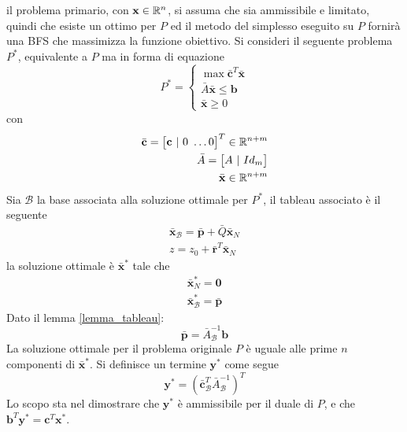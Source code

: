 \documentclass[10pt, letterpaper]{report}
\begin{document}
il problema primario, con $\mathbf x \in {\mathbb R}^n$, si assuma che sia ammissibile e limitato, quindi che esiste un ottimo per $P$ ed il metodo del simplesso eseguito su $P$ fornirà una BFS che massimizza la funzione obiettivo. Si consideri il seguente problema $P^*$, equivalente a $P$ ma in forma di equazione
$$ P^*=\begin{cases}
    \max \bar {\mathbf c}^T\bar {\mathbf x}\\ 
        \bar A\bar {\mathbf x} \le \mathbf b \\ 
        \bar {\mathbf x} \ge 0 
\end{cases}$$
con \begin{eqnarray*}
    \bar {\mathbf c} = \begin{bmatrix}
        \mathbf c \ | \ 0 \ \dots 0 
    \end{bmatrix}^T \in {\mathbb R}^{n+m}\\ 
    \bar A = \begin{bmatrix}
        A \ | \ Id_m 
    \end{bmatrix}\\ \bar {\mathbf x}\in {\mathbb R}^{n+m}
\end{eqnarray*}
Sia $\mathcal B$ la base associata alla soluzione ottimale per $P^*$, il tableau associato è il seguente \begin{eqnarray*}
    \bar {\mathbf x}_{\mathcal B}= \bar {\mathbf p}+\bar Q  \bar {\mathbf x}_{N}\\ 
    z=z_0+\bar {\mathbf r}^T \bar {\mathbf x}_{N}
\end{eqnarray*}
la soluzione ottimale è $ \bar {\mathbf x}^*$ tale che \begin{eqnarray*}
    \bar {\mathbf x}^*_N=\mathbf 0 \\ 
    \bar {\mathbf x}^*_{\mathcal B} = \bar {\mathbf p}
\end{eqnarray*}
Dato il lemma \ref{lemma_tableau}: 
$$\bar {\mathbf p}=\bar A^{-1}_{\mathcal B}\mathbf b $$
La soluzione ottimale per il problema originale $P$ è uguale alle prime $n$ componenti di $ \bar {\mathbf x}^*$. Si definisce un termine $\mathbf y^*$ come segue \begin{equation}
    \mathbf y^*=( \bar {\mathbf c}^T_{\mathcal{B}}\bar A^{-1}_{\mathcal B})^T
\end{equation}
Lo scopo sta nel dimostrare che $\mathbf y^*$ è ammissibile per il duale di $P$, e che $\mathbf b^T\mathbf y^*=\mathbf c^T\mathbf x^*$.\bigskip 
\end{document}
